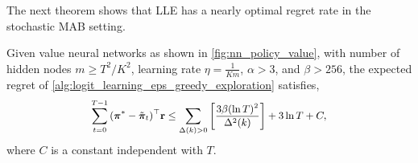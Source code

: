 The next theorem shows that LLE has a nearly optimal regret rate in the stochastic MAB setting.
\begin{thm}
\label{thm:logit_learning_main_result}
    Given value neural networks as shown in \cref{fig:nn_policy_value}, with number of hidden nodes $m \ge T^2 / K^2$, learning rate $\eta = \frac{1}{K m}$,  $\alpha > 3$, and $\beta > 256$, the expected regret of \cref{alg:logit_learning_eps_greedy_exploration} satisfies,
\begin{equation*}
\small
\begin{split}
    \sum\limits_{t=0}^{T-1}{ ( {\rvpi^*} - \tilde{\rvpi}_t)^\top \rvr } \le \sum\limits_{\Delta(k) > 0}{ \left[ \frac{ 3 \beta ( \ln{T} )^2}{\Delta^2(k)} \right] }  + 3 \ln{T} + C,
\end{split}
\end{equation*}
where $C$ is a constant independent with $T$.
\end{thm}
